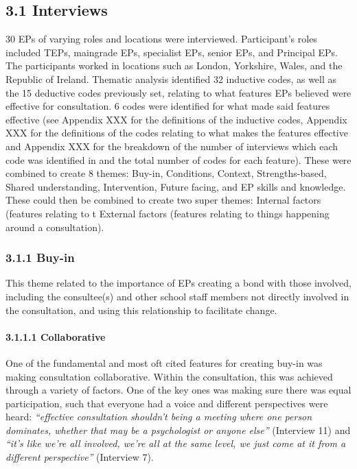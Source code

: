 \documentclass[
  english,
  man]{apa}
\let\oldparagraph\paragraph
\renewcommand{\paragraph}[1]{\oldparagraph{#1}\mbox{}}
\begin{document}
\elandscape

\hypertarget{interviews-2}{%
\subsection{3.1 Interviews}\label{interviews-2}}

30 EPs of varying roles and locations were interviewed. Participant's roles included TEPs, maingrade EPs, specialist EPs, senior EPs, and Principal EPs. The participants worked in locations such as London, Yorkshire, Wales, and the Republic of Ireland. Thematic analysis identified 32 inductive codes, as well as the 15 deductive codes previously set, relating to what features EPs believed were effective for consultation. 6 codes were identified for what made said features effective (see Appendix XXX for the definitions of the inductive codes, Appendix XXX for the definitions of the codes relating to what makes the features effective and Appendix XXX for the breakdown of the number of interviews which each code was identified in and the total number of codes for each feature). These were combined to create 8 themes: Buy-in, Conditions, Context, Strengths-based, Shared understanding, Intervention, Future facing, and EP skills and knowledge. These could then be combined to create two super themes: Internal factors (features relating to t External factors (features relating to things happening around a consultation).

\hypertarget{buy-in}{%
\subsubsection{3.1.1 Buy-in}\label{buy-in}}

This theme related to the importance of EPs creating a bond with those involved, including the consultee(s) and other school staff members not directly involved in the consultation, and using this relationship to facilitate change.

\hypertarget{collaborative}{%
\paragraph{3.1.1.1 Collaborative}\label{collaborative}}

One of the fundamental and most oft cited features for creating buy-in was making consultation collaborative. Within the consultation, this was achieved through a variety of factors. One of the key ones was making sure there was equal participation, such that everyone had a voice and different perspectives were heard: \emph{``effective consultation shouldn't being a meeting where one person dominates, whether that may be a psychologist or anyone else''} (Interview 11) and \emph{``it's like we're all involved, we're all at the same level, we just come at it from a different perspective''} (Interview 7).
\end{document}
